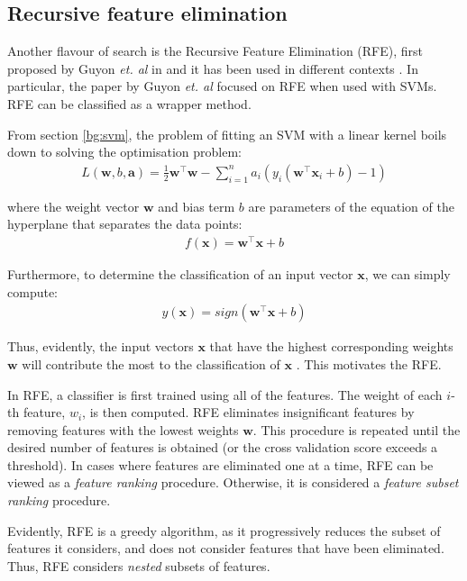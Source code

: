 \documentclass[12pt, twoside, a4paper]{report}
\def\vec{\boldsymbol}
\begin{document}
\subsection{Recursive feature elimination} \label{bg:fs:rfe}
Another flavour of search is the Recursive Feature Elimination (RFE), first proposed by Guyon \textit{et. al} in \cite{RefWorks:228} and it has been used in different contexts \cite{RefWorks:229, RefWorks:230, RefWorks:231}. In particular, the paper by Guyon \textit{et. al} focused on RFE when used with SVMs. RFE can be classified as a wrapper method.

From section \ref{bg:svm}, the problem of fitting an SVM with a linear kernel boils down to solving the optimisation problem:
\begin{align*}
L(\boldsymbol w, b, \boldsymbol a)
= \frac{1}{2} \boldsymbol w^\top \boldsymbol w - \sum_{i=1}^n a_i (y_i(\boldsymbol w^\top \boldsymbol x_i + b) - 1)
\end{align*}

where the weight vector $\vec{w}$ and bias term $b$ are parameters of the equation of the hyperplane that separates the data points:
\begin{align*}
f(\vec{x}) = \vec{w}^\top \vec{x} + b
\end{align*}

Furthermore, to determine the classification of an input vector $\vec{x}$, we can simply compute:
\begin{align*}
y(\vec{x}) = sign(\vec{w}^\top \vec{x} + b)
\end{align*}

Thus, evidently, the input vectors $\vec{x}$ that have the highest corresponding weights $\vec{w}$ will contribute the most to the classification of $\vec{x}$ \cite{RefWorks:229}. This motivates the RFE.

In RFE, a classifier is first trained using all of the features. The weight of each $i$-th feature, $w_i$, is then computed. RFE eliminates insignificant features by removing features with the lowest weights $\vec{w}$. This procedure is repeated until the desired number of features is obtained (or the cross validation score exceeds a threshold). In cases where features are eliminated one at a time, RFE can be viewed as a \textit{feature ranking} procedure. Otherwise, it is considered a \textit{feature subset ranking} procedure.

Evidently, RFE is a greedy algorithm, as it progressively reduces the subset of features it considers, and does not consider features that have been eliminated. Thus, RFE considers \textit{nested} subsets of features.
\end{document}
